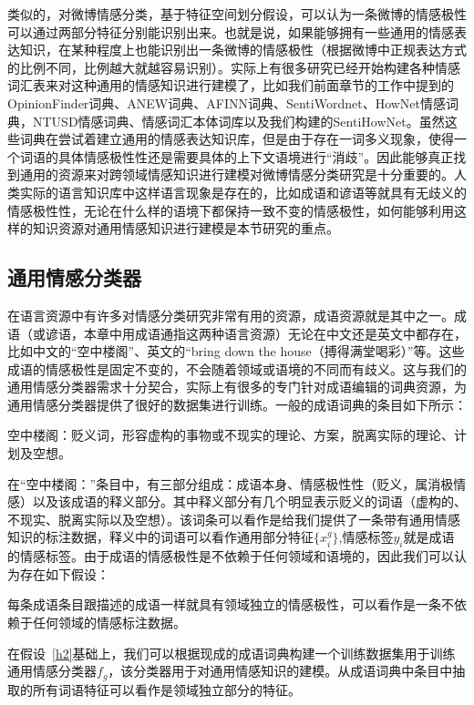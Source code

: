 类似的，对微博情感分类，基于特征空间划分假设，可以认为一条微博的情感极性可以通过两部分特征分别能识别出来。也就是说，如果能够拥有一些通用的情感表达知识，在某种程度上也能识别出一条微博的情感极性（根据微博中正规表达方式的比例不同，比例越大就越容易识别）。实际上有很多研究已经开始构建各种情感词汇表来对这种通用的情感知识进行建模了，比如我们前面章节的工作中提到的OpinionFinder词典、ANEW词典、AFINN词典、SentiWordnet、HowNet情感词典，NTUSD情感词典、情感词汇本体词库以及我们构建的SentiHowNet。虽然这些词典在尝试着建立通用的情感表达知识库，但是由于存在一词多义现象，使得一个词语的具体情感极性性还是需要具体的上下文语境进行“消歧”。因此能够真正找到通用的资源来对跨领域情感知识进行建模对微博情感分类研究是十分重要的。人类实际的语言知识库中这样语言现象是存在的，比如成语和谚语等就具有无歧义的情感极性性，无论在什么样的语境下都保持一致不变的情感极性，如何能够利用这样的知识资源对通用情感知识进行建模是本节研究的重点。

\subsection{通用情感分类器}
\label{general}
在语言资源中有许多对情感分类研究非常有用的资源，成语资源就是其中之一。成语（或谚语，本章中用成语通指这两种语言资源）无论在中文还是英文中都存在，比如中文的“空中楼阁”、英文的“bring down the house（搏得满堂喝彩）”等。这些成语的情感极性是固定不变的，不会随着领域或语境的不同而有歧义。这与我们的通用情感分类器需求十分契合，实际上有很多的专门针对成语编辑的词典资源，为通用情感分类器提供了很好的数据集进行训练。一般的成语词典的条目如下所示：

空中楼阁：贬义词，形容虚构的事物或不现实的理论、方案，脱离实际的理论、计划及空想。

在“空中楼阁：”条目中，有三部分组成：成语本身、情感极性性（贬义，属消极情感）以及该成语的释义部分。其中释义部分有几个明显表示贬义的词语（虚构的、不现实、脱离实际以及空想）。该词条可以看作是给我们提供了一条带有通用情感知识的标注数据，释义中的词语可以看作通用部分特征$\{x_i^g\}$,情感标签$y_i$就是成语的情感标签。由于成语的情感极性是不依赖于任何领域和语境的，因此我们可以认为存在如下假设：

\begin{assumption}[条目情感极性]
\label{h2}
每条成语条目跟描述的成语一样就具有领域独立的情感极性，可以看作是一条不依赖于任何领域的情感标注数据。
\end{assumption}
在假设~\ref{h2}基础上，我们可以根据现成的成语词典构建一个训练数据集用于训练通用情感分类器$f_g$，该分类器用于对通用情感知识的建模。从成语词典中条目中抽取的所有词语特征可以看作是领域独立部分的特征。

